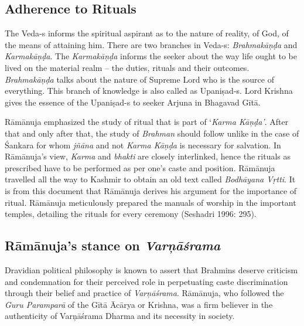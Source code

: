 \subsection*{Adherence to Rituals}

The Veda-s informs the spiritual aspirant as to the nature of reality, of God, of the means of attaining him. There are two branches in Veda-s: \textit{Brahmakāņḍa} and \textit{Karmakāņḍa}. The \textit{Karmakāņḍa} informs the seeker about the way life ought to be lived on the material realm – the duties, rituals and their outcomes. \textit{Brahmakāņḍa} talks about the nature of Supreme Lord who is the source of everything. This branch of knowledge is also called as Upaniṣad-s. Lord Krishna gives the essence of the Upaniṣad-s to seeker Arjuna in Bhagavad Gītā.

\newpage

Rāmānuja emphasized the study of ritual that is part of ‘\textit{Karma Kāņḍa’}. After that and only after that, the study of \textit{Brahman} should follow unlike in the case of Śankara for whom \textit{jñāna }and not \textit{Karma Kāņḍa} is necessary for salvation. In Rāmānuja’s view, \textit{Karma} and \textit{bhakti} are closely interlinked, hence the rituals as prescribed have to be performed as per one’s caste and position. Rāmānuja travelled all the way to Kashmir to obtain an old text called \textit{Bodhāyana Vṛtti}. It is from this document that Rāmānuja derives his argument for the importance of ritual. Rāmānuja meticulously prepared the manuals of worship in the important temples, detailing the rituals for every ceremony (Seshadri 1996: 295).


\subsection*{Rāmānuja’s stance on \textit{Varņāśrama}}

Dravidian political philosophy is known to assert that Brahmins deserve criticism and condemnation for their perceived role in perpetuating caste discrimination through their belief and practice of \textit{Varņāśrama}. Rāmānuja, who followed the \textit{Guru Paramparā} of the Gītā Ācārya or Krishna, was a firm believer in the authenticity of Varņāśrama Dharma and its necessity in society.

